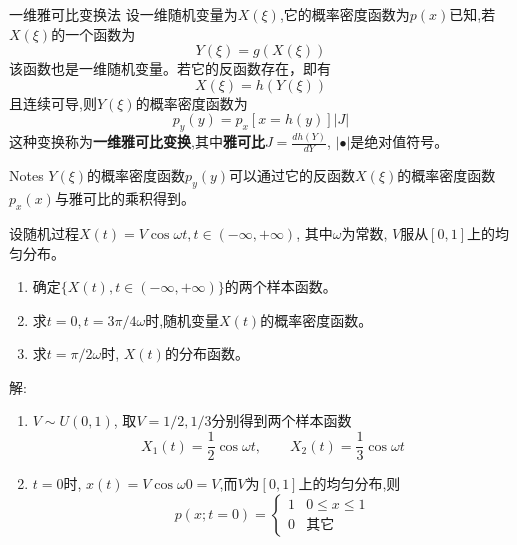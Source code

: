 \begin{frame}{一维雅可比变换法}
设一维随机变量为$X(\xi)$,它的概率密度函数为$p(x)$已知,若$X(\xi)$的一个函数为
\[Y(\xi)=g(X(\xi)) \]
该函数也是一维随机变量。若它的反函数存在，即有
\[X(\xi)=h(Y(\xi)) \]
且连续可导,则$Y(\xi)$的概率密度函数为
\[p_y(y)=p_x[x=h(y)]|J| \]
这种变换称为\textbf{一维雅可比变换},其中\textbf{雅可比}$J=\frac{dh(Y)}{dY}$, $|\bullet|$是绝对值符号。
\begin{block}{Notes}
	$Y(\xi)$的概率密度函数$p_y(y)$可以通过它的反函数$X(\xi)$的概率密度函数$p_x(x)$与雅可比的乘积得到。
\end{block}
\end{frame}

\begin{frame}
\begin{example}
	设随机过程$X(t)=V\cos\omega t,t\in(-\infty,+\infty)$, 其中$\omega$为常数, $V$服从$[0,1]$上的均匀分布。
	\begin{enumerate}
		\item 确定$\{X(t),t\in(-\infty,+\infty)\}$的两个样本函数。
		\item 求$t=0,t=3\pi/4\omega$时,随机变量$X(t)$的概率密度函数。
		\item 求$t=\pi/2\omega$时, $X(t)$的分布函数。
	\end{enumerate}
\end{example}
\end{frame}

\begin{frame}
解:
\begin{enumerate}
	\item $V\sim U(0,1)$, 取$V=1/2,1/3$分别得到两个样本函数
	\[X_1(t)=\frac{1}{2}\cos\omega t,\qquad X_2(t)=\frac{1}{3}\cos\omega t\]
	\item $t=0$时, $x(t)=V\cos\omega 0=V$,而$V$为$[0,1]$上的均匀分布,则
	$$
	p(x;t=0)=\begin{cases}
	1 & 0\le x\le 1\\
	0 &\text{其它}	
    \end{cases}
    $$
\end{enumerate}
\end{frame}

